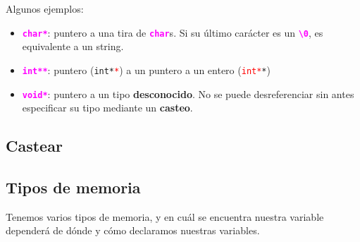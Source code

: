 \documentclass[]{scrartcl}
\newcommand{\hl}[1]{\textcolor{magenta}{\textbf{\texttt{#1}}}}
\begin{document}
Algunos ejemplos:
\begin{itemize}
  \item \hl{char*}: puntero a una tira de \hl{char}s. Si su último carácter es un \hl{\textquotesingle\textbackslash0\textquotesingle}, es equivalente a un string.
  \item \hl{int**}: puntero (\texttt{int*\textcolor{red}{*}}) a un puntero a un entero (\texttt{\textcolor{red}{int*}*})
  \item \hl{void*}: puntero a un tipo \textbf{desconocido}.
        No se puede desreferenciar sin antes especificar su tipo mediante un \textbf{casteo}.
\end{itemize}
%
\begin{center}
  \noindent {}
  \label{fig:doble-puntero}
\end{center}

\subsection*{Castear}

\subsection*{Tipos de memoria}

Tenemos varios tipos de memoria, y en cuál se encuentra nuestra variable dependerá de dónde y cómo declaramos nuestras variables.
\end{document}

